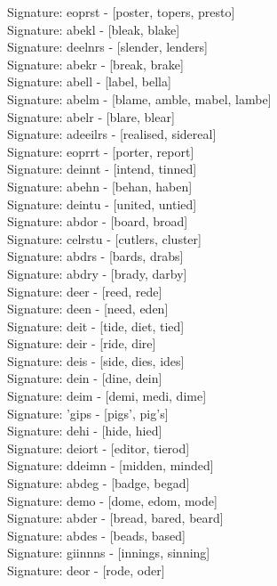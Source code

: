 Signature: {eoprst} - [poster, topers, presto] \\
Signature: {abekl} - [bleak, blake] \\
Signature: {deelnrs} - [slender, lenders] \\
Signature: {abekr} - [break, brake] \\
Signature: {abell} - [label, bella] \\
Signature: {abelm} - [blame, amble, mabel, lambe] \\
Signature: {abelr} - [blare, blear] \\
Signature: {adeeilrs} - [realised, sidereal] \\
Signature: {eoprrt} - [porter, report] \\
Signature: {deinnt} - [intend, tinned] \\
Signature: {abehn} - [behan, haben] \\
Signature: {deintu} - [united, untied] \\
Signature: {abdor} - [board, broad] \\
Signature: {celrstu} - [cutlers, cluster] \\
Signature: {abdrs} - [bards, drabs] \\
Signature: {abdry} - [brady, darby] \\
Signature: {deer} - [reed, rede] \\
Signature: {deen} - [need, eden] \\
Signature: {deit} - [tide, diet, tied] \\
Signature: {deir} - [ride, dire] \\
Signature: {deis} - [side, dies, ides] \\
Signature: {dein} - [dine, dein] \\
Signature: {deim} - [demi, medi, dime] \\
Signature: {'gips} - [pigs', pig's] \\
Signature: {dehi} - [hide, hied] \\
Signature: {deiort} - [editor, tierod] \\
Signature: {ddeimn} - [midden, minded] \\
Signature: {abdeg} - [badge, begad] \\
Signature: {demo} - [dome, edom, mode] \\
Signature: {abder} - [bread, bared, beard] \\
Signature: {abdes} - [beads, based] \\
Signature: {giinnns} - [innings, sinning] \\
Signature: {deor} - [rode, oder] \\
